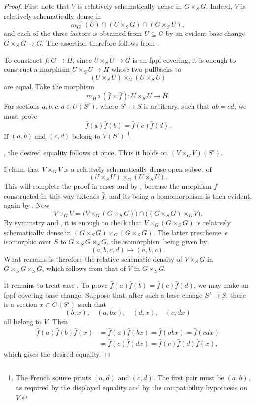 \begin{proof}
First note that \(V\) is relatively schematically dense in
\(G\times_S G\). Indeed, \(V\) is relatively schematically dense in
\[
  m_G^{-1}(U)\cap(U\times_S G)\cap(G\times_S U),
\]
and each of the three factors is obtained from \(U\subseteq G\) by
an evident base change \(G\times_S G\to G\). The assertion therefore
follows from .

To construct \(f:G\to H\), since \(U\times_S U\to G\) is an fppf
covering, it is enough to construct a morphism \(U\times_S U\to H\)
whose two pullbacks to
\[
  (U\times_S U)\times_G(U\times_S U)
\]
are equal. Take the morphism
\[
  m_H\circ(\bar f\times\bar f):U\times_S U\longrightarrow H.
\]
For sections \(a,b,c,d\in U(S')\), where \(S'\to S\) is arbitrary,
such that \(ab=cd\), we must prove
\[
  \bar f(a)\bar f(b)=\bar f(c)\bar f(d).
\]
If \((a,b)\) and \((c,d)\) belong to \(V(S')\)\begingroup
\renewcommand{\thefootnote}{\ensuremath{\ddagger}}\footnote{The
French source prints \((a,d)\) and \((c,d)\). The first pair must be
\((a,b)\), as required by the displayed equality and by the
compatibility hypothesis on \(V\).}
\addtocounter{footnote}{-1}
\endgroup, the desired equality follows at once. Thus it holds on
\((V\times_G V)(S')\).

I claim that \(V\times_G V\) is a relatively schematically dense
open subset of
\[
  (U\times_S U)\times_G(U\times_S U).
\]
This will complete the proof in cases \textup{} and \textup{}
by , because the morphism \(f\) constructed in this way extends
\(\bar f\), and its being a homomorphism is then evident, again by
. Now
\[
  V\times_G V
  =
  \bigl(V\times_G(G\times_S G)\bigr)
  \cap
  \bigl((G\times_S G)\times_G V\bigr).
\]
By symmetry and , it is enough to check that
\(V\times_G(G\times_S G)\) is relatively schematically dense in
\((G\times_S G)\times_G(G\times_S G)\). The latter prescheme is
isomorphic over \(S\) to \(G\times_S G\times_S G\), the isomorphism
being given by
\[
  (a,b,c,d)\longmapsto(a,b,c).
\]
What remains is therefore the relative schematic density of
\(V\times_S G\) in \(G\times_S G\times_S G\), which follows from
that of \(V\) in \(G\times_S G\).

It remains to treat case \textup{}. To prove
\(\bar f(a)\bar f(b)=\bar f(c)\bar f(d)\), we may make an fppf
covering base change. Suppose that, after such a base change
\(S'\to S\), there is a section \(x\in G(S')\) such that
\[
  (b,x),\quad(a,bx),\quad(d,x),\quad(c,dx)
\]
all belong to \(V\). Then
\[
\begin{aligned}
  \bar f(a)\bar f(b)\bar f(x)
    &=\bar f(a)\bar f(bx)
     =\bar f(abx)
     =\bar f(cdx)\\
    &=\bar f(c)\bar f(dx)
     =\bar f(c)\bar f(d)\bar f(x),
\end{aligned}
\]
which gives the desired equality.


\end{proof}
